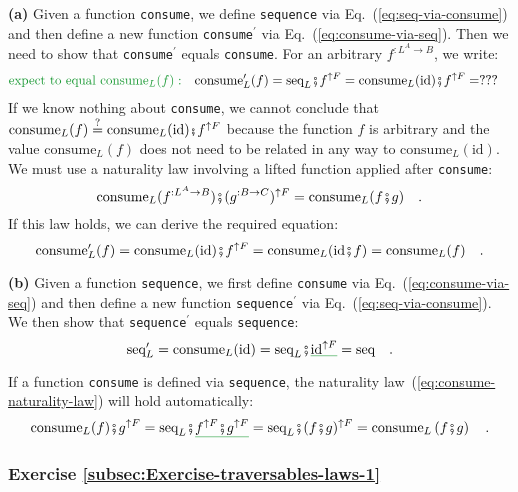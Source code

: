 \textbf{(a)} Given a function \lstinline!consume!, we define \lstinline!sequence!
via Eq.~(\ref{eq:seq-via-consume}) and then define a new function
\lstinline!consume!$^{\prime}$ via Eq.~(\ref{eq:consume-via-seq}).
Then we need to show that \lstinline!consume!$^{\prime}$ equals
\lstinline!consume!. For an arbitrary $f^{:L^{A}\rightarrow B}$,
we write:
\begin{align*}
{\color{greenunder}\text{expect to equal }\text{consume}_{L}(f):}\quad & \text{consume}_{L}^{\prime}(f)=\text{seq}_{L}\bef f^{\uparrow F}=\text{consume}_{L}(\text{id})\bef f^{\uparrow F}=???
\end{align*}
If we know nothing about \lstinline!consume!, we cannot conclude
that $\text{consume}_{L}(f)\overset{?}{=}\text{consume}_{L}(\text{id})\bef f^{\uparrow F}$
because the function $f$ is arbitrary and the value $\text{consume}_{L}(f)$
does not need to be related in any way to $\text{consume}_{L}(\text{id})$.
We must use a naturality law involving a lifted function applied after
\lstinline!consume!:
\begin{equation}
\text{consume}_{L}(f^{:L^{A}\rightarrow B})\bef(g^{:B\rightarrow C})^{\uparrow F}=\text{consume}_{L}(f\bef g)\quad.\label{eq:consume-naturality-law}
\end{equation}
If this law holds, we can derive the required equation:
\[
\text{consume}_{L}^{\prime}(f)=\text{consume}_{L}(\text{id})\bef f^{\uparrow F}=\text{consume}_{L}(\text{id}\bef f)=\text{consume}_{L}(f)\quad.
\]

\textbf{(b)} Given a function \lstinline!sequence!, we first define
\lstinline!consume! via Eq.~(\ref{eq:consume-via-seq}) and then
define a new function \lstinline!sequence!$^{\prime}$ via Eq.~(\ref{eq:seq-via-consume}).
We then show that \lstinline!sequence!$^{\prime}$ equals \lstinline!sequence!:
\[
\text{seq}_{L}^{\prime}=\text{consume}_{L}(\text{id})=\text{seq}_{L}\bef\gunderline{\text{id}^{\uparrow F}}=\text{seq}\quad.
\]

If a function \lstinline!consume! is defined via \lstinline!sequence!,
the naturality law~(\ref{eq:consume-naturality-law}) will hold automatically:
\[
\text{consume}_{L}(f)\bef g^{\uparrow F}=\text{seq}_{L}\bef\gunderline{f^{\uparrow F}\bef g^{\uparrow F}}=\text{seq}_{L}\bef(f\bef g)^{\uparrow F}=\text{consume}_{L}\left(f\bef g\right)\quad.
\]


\subsubsection*{Exercise \ref{subsec:Exercise-traversables-laws-1}}

